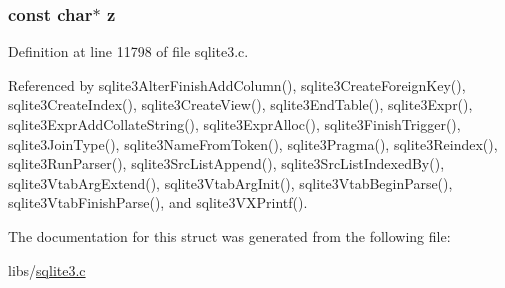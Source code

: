 \hypertarget{struct_token_aaa6cadadf922a338c70151eeed2b09ec}{}
\subsubsection[{z}]{\setlength{\rightskip}{0pt plus 5cm}const char$\ast$ z}\label{struct_token_aaa6cadadf922a338c70151eeed2b09ec}


Definition at line 11798 of file sqlite3.\+c.



Referenced by sqlite3\+Alter\+Finish\+Add\+Column(), sqlite3\+Create\+Foreign\+Key(), sqlite3\+Create\+Index(), sqlite3\+Create\+View(), sqlite3\+End\+Table(), sqlite3\+Expr(), sqlite3\+Expr\+Add\+Collate\+String(), sqlite3\+Expr\+Alloc(), sqlite3\+Finish\+Trigger(), sqlite3\+Join\+Type(), sqlite3\+Name\+From\+Token(), sqlite3\+Pragma(), sqlite3\+Reindex(), sqlite3\+Run\+Parser(), sqlite3\+Src\+List\+Append(), sqlite3\+Src\+List\+Indexed\+By(), sqlite3\+Vtab\+Arg\+Extend(), sqlite3\+Vtab\+Arg\+Init(), sqlite3\+Vtab\+Begin\+Parse(), sqlite3\+Vtab\+Finish\+Parse(), and sqlite3\+V\+X\+Printf().



The documentation for this struct was generated from the following file\+:\begin{DoxyCompactItemize}
\item 
libs/\hyperlink{sqlite3_8c}{sqlite3.\+c}\end{DoxyCompactItemize}
